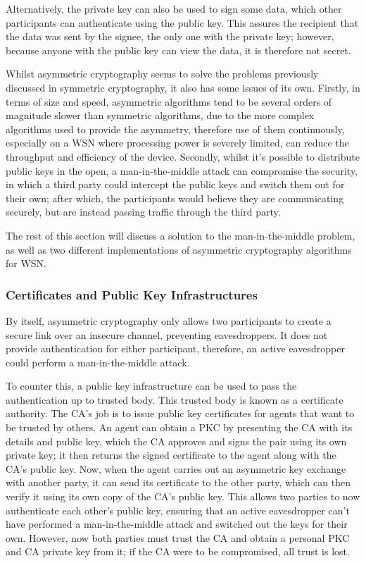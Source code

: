 \documentclass{mprop}
\begin{document}
Alternatively, the private key can also be used to sign some data, which other participants can authenticate using the public key. This assures the recipient that the data was sent by the signee, the only one with the private key; however, because anyone with the public key can view the data, it is therefore not secret.

Whilst asymmetric cryptography seems to solve the problems previously discussed in symmetric cryptography, it also has some issues of its own. Firstly, in terms of size and speed, asymmetric algorithms tend to be several orders of magnitude slower than symmetric algorithms, due to the more complex algorithms used to provide the asymmetry, therefore use of them continuously, especially on a WSN where processing power is severely limited, can reduce the throughput and efficiency of the device.
Secondly, whilst it's possible to distribute public keys in the open, a man-in-the-middle attack can compromise the security, in which a third party could intercept the public keys and switch them out for their own; after which, the participants would believe they are communicating securely, but are instead passing traffic through the third party.

The rest of this section will discuss a solution to the man-in-the-middle problem, as well as two different implementations of asymmetric cryptography algorithms for WSN.

\subsubsection{Certificates and Public Key Infrastructures} %
\label{ssub:certificates_and_public_key_infrastructures}
By itself, asymmetric cryptography only allows two participants to create a secure link over an insecure channel, preventing eavesdroppers. It does not provide authentication for either participant, therefore, an active eavesdropper could perform a man-in-the-middle attack. 

To counter this, a public key infrastructure can be used to pass the authentication up to trusted body. This trusted body is known as a certificate authority. The CA's job is to issue public key certificates for agents that want to be trusted by others. An agent can obtain a PKC by presenting the CA with its details and public key, which the CA approves and signs the pair using its own private key; it then returns the signed certificate to the agent along with the CA's public key. Now, when the agent carries out an asymmetric key exchange with another party, it can send its certificate to the other party, which can then verify it using its own copy of the CA's public key. This allows two parties to now authenticate each other's public key, ensuring that an active eavesdropper can't have performed a man-in-the-middle attack and switched out the keys for their own. However, now both parties must trust the CA and obtain a personal PKC and CA private key from it; if the CA were to be compromised, all trust is lost.
\end{document}
